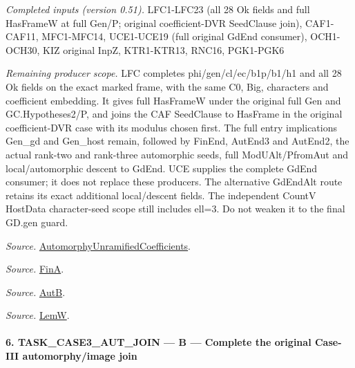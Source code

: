 \emph{Completed inputs (version 0.51).} LFC1-LFC23 (all 28 Ok fields and full HasFrameW at full Gen/P; original coefficient-DVR SeedClause join), CAF1-CAF11, MFC1-MFC14, UCE1-UCE19 (full original GdEnd consumer), OCH1-OCH30, KIZ original InpZ, KTR1-KTR13, RNC16, PGK1-PGK6

\emph{Remaining producer scope.} LFC completes phi/gen/cl/ec/b1p/b1/h1 and all 28 Ok fields on the exact marked frame, with the same C0, Big, characters and coefficient embedding. It gives full HasFrameW under the original full Gen and GC.Hypotheses2/P, and joins the CAF SeedClause to HasFrame in the original coefficient-DVR case with its modulus chosen first. The full entry implications Gen\_\allowbreak gd and Gen\_\allowbreak host remain, followed by FinEnd, AutEnd3 and AutEnd2, the actual rank-two and rank-three automorphic seeds, full ModUAlt/PfromAut and local/automorphic descent to GdEnd. UCE supplies the complete GdEnd consumer; it does not replace these producers. The alternative GdEndAlt route retains its exact additional local/descent fields. The independent CountV HostData character-seed scope still includes ell=3. Do not weaken it to the final GD.gen guard.

\emph{Source.} \href{https://github.com/CocoSgt/riemann-hypothesis-lean/blob/7cbf7a0c32fca1badf05931879a37c3f8a2b03b4/src/Development/AutomorphicArithmetic/AutomorphicVarieties/AutomorphicCases/AutomorphyUnramifiedCoefficients.lean#L24-L27}{AutomorphyUnramifiedCoefficients}.

\emph{Source.} \href{https://github.com/CocoSgt/riemann-hypothesis-lean/blob/7cbf7a0c32fca1badf05931879a37c3f8a2b03b4/src/Development/AutomorphicArithmetic/AutomorphicVarieties/AutomorphicCases/AutomorphyUnramifiedCoefficients.lean#L12-L13}{FinA}.

\emph{Source.} \href{https://github.com/CocoSgt/riemann-hypothesis-lean/blob/7cbf7a0c32fca1badf05931879a37c3f8a2b03b4/src/Development/AutomorphicArithmetic/AutomorphicVarieties/AutomorphicCases/AutomorphyUnramifiedCoefficients.lean#L15-L17}{AutB}.

\emph{Source.} \href{https://github.com/CocoSgt/riemann-hypothesis-lean/blob/7cbf7a0c32fca1badf05931879a37c3f8a2b03b4/src/Development/AutomorphicArithmetic/AutomorphicVarieties/AutomorphicCases/AutomorphyUnramifiedCoefficients.lean#L19-L22}{LemW}.



\paragraph{6. TASK\_\allowbreak CASE3\_\allowbreak AUT\_\allowbreak JOIN — B — Complete the original Case-III automorphy/image join}

